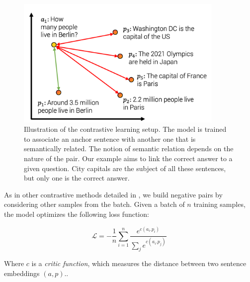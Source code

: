 \begin{figure}[htb!]
	\includegraphics[width=10cm]{images/contrastive_1.png}
	\caption[Contrastive learning]{Illustration of the contrastive learning setup. The model is trained to associate an anchor sentence with another one that is semantically related. The notion of semantic relation depends on the nature of the pair. Our example aims to link the correct answer to a given question. City capitals are the subject of all these sentences, but only one is the correct answer.}
\end{figure}

As in other contrastive methods detailed in , we build negative pairs by considering other samples from the batch. Given a batch of $n$ training samples, the model optimizes the following loss function:

\begin{equation}
    \mathcal{L} = -\frac{1}{n}\sum_{i=1}^n\frac{e^{c(a_i. p_i)}}{\sum_j e^{c(a_i. p_j)}}    
\end{equation}

Where $c$ is a \textit{critic function}, which measures the distance between two sentence embeddings $(a, p)$..



